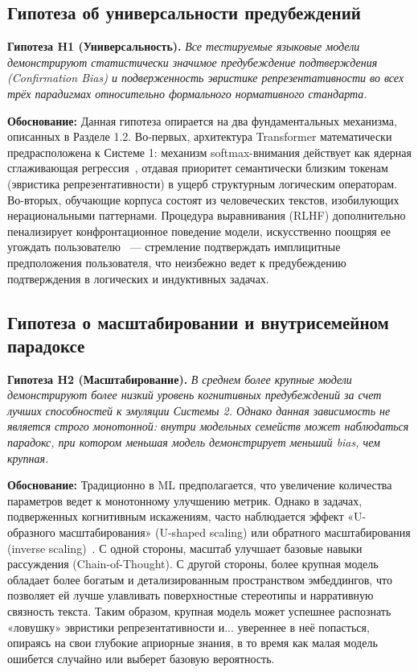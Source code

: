 \subsection{Гипотеза об универсальности предубеждений}

\textbf{Гипотеза H1 (Универсальность).} \textit{Все тестируемые языковые модели демонстрируют статистически значимое предубеждение подтверждения (Confirmation Bias) и подверженность эвристике репрезентативности во всех трёх парадигмах относительно формального нормативного стандарта.}

\textbf{Обоснование:} Данная гипотеза опирается на два фундаментальных механизма, описанных в Разделе 1.2. Во-первых, архитектура Transformer математически предрасположена к Системе 1: механизм softmax-внимания действует как ядерная сглаживающая регрессия~\cite{han2023explaining}, отдавая приоритет семантически близким токенам (эвристика репрезентативности) в ущерб структурным логическим операторам. Во-вторых, обучающие корпуса состоят из человеческих текстов, изобилующих нерациональными паттернами. Процедура выравнивания (RLHF) дополнительно пенализирует конфронтационное поведение модели, искусственно поощряя ее угождать пользователю~\cite{batista2026rational} --- стремление подтверждать имплицитные предположения пользователя, что неизбежно ведет к предубеждению подтверждения в логических и индуктивных задачах.

\subsection{Гипотеза о масштабировании и внутрисемейном парадоксе}

\textbf{Гипотеза H2 (Масштабирование).} \textit{В среднем более крупные модели демонстрируют более низкий уровень когнитивных предубеждений за счет лучших способностей к эмуляции Системы 2. Однако данная зависимость не является строго монотонной: внутри модельных семейств может наблюдаться парадокс, при котором меньшая модель демонстрирует меньший bias, чем крупная.}

\textbf{Обоснование:} Традиционно в ML предполагается, что увеличение количества параметров ведет к монотонному улучшению метрик. Однако в задачах, подверженных когнитивным искажениям, часто наблюдается эффект «U-образного масштабирования» (U-shaped scaling) или обратного масштабирования (inverse scaling)~\cite{dasgupta2024language}. С одной стороны, масштаб улучшает базовые навыки рассуждения (Chain-of-Thought). С другой стороны, более крупная модель обладает более богатым и детализированным пространством эмбеддингов, что позволяет ей лучше улавливать поверхностные стереотипы и нарративную связность текста. Таким образом, крупная модель может успешнее распознать «ловушку» эвристики репрезентативности и... увереннее в неё попасться, опираясь на свои глубокие априорные знания, в то время как малая модель ошибется случайно или выберет базовую вероятность.

